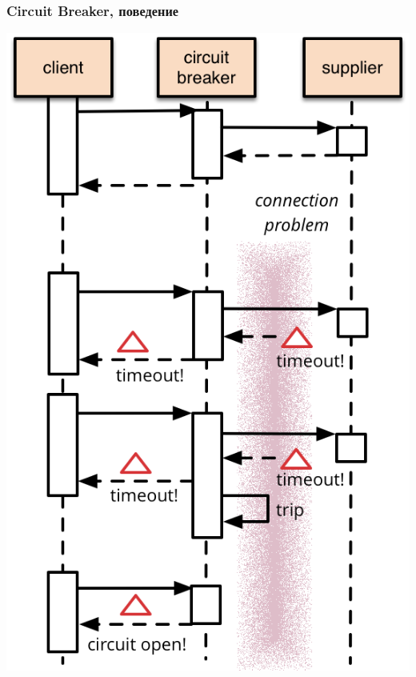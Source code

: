 \documentclass{../../slides-style}
\begin{document}
    \begin{frame}
        \frametitle{Circuit Breaker, поведение}
        \begin{center}
            \includegraphics[height=0.7\textheight]{circuitBreakerSequence.png}
        \end{center}
    \end{frame}
\end{document}
